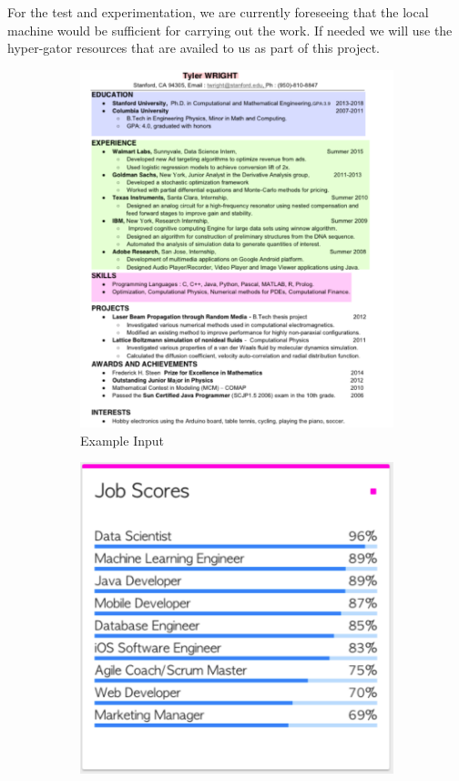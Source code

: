 \documentclass[11pt,letterpaper]{article}
\begin{document}
For the test and experimentation, we are currently foreseeing that the local machine would be sufficient for carrying out the work. If needed we will use the hyper-gator resources that are availed to us as part of this project. 

\begin{figure}[h!]
	\centering
	\begin{subfigure}[b]{0.45\linewidth}
		\includegraphics[width=\linewidth]{images/resume.png}
		\caption{Example Input}
	\end{subfigure}
	\begin{subfigure}[b]{0.45\linewidth}
		\includegraphics[width=\linewidth]{images/job_title.png}

\end{subfigure}
\end{figure}
\end{document}
